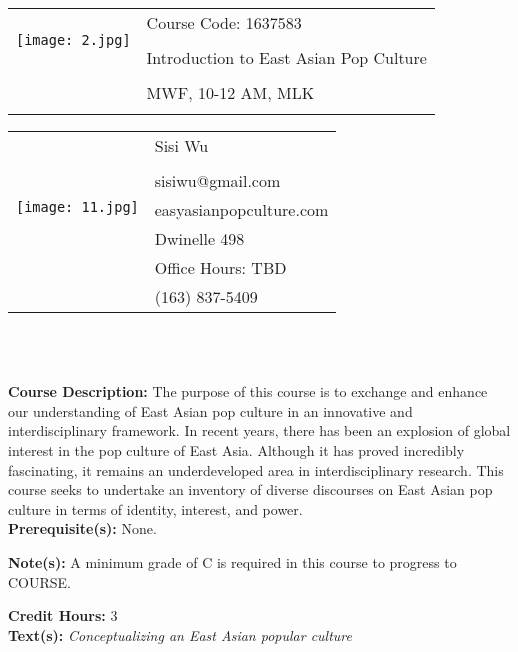 \documentclass[11pt]{article}
\begin{document}
\begin{tabular}{ l l }
  \multirow{3}{*}{\texttt{[image: 2.jpg]}} & \LARGE Course Code: 1637583 \\\\
      & \LARGE Introduction to East Asian Pop Culture \\\\
  & \LARGE MWF, 10-12 AM, MLK \\\\
\end{tabular}
\vspace{10mm}

\begin{tabular}{ l l }
  \multirow{6}{*}{\texttt{[image: 11.jpg]}} & \large Sisi Wu\\\\
  & \large sisiwu@gmail.com \\
  & \large easyasianpopculture.com \\
  & \large Dwinelle 498  \\
  & \large Office Hours: TBD \\
  & \large (163) 837-5409 \\
\end{tabular}
\vspace{5mm}
\begin{center}  \\
\end{center}

\textbf {\large \\ Course Description:} The purpose of this course is to exchange and enhance our understanding of East Asian pop culture in an innovative and interdisciplinary framework. In recent years, there has been an explosion of global interest in the pop culture of East Asia. Although it has proved incredibly fascinating, it remains an underdeveloped area in interdisciplinary research. This course seeks to undertake an inventory of diverse discourses on East Asian pop culture in terms of identity, interest, and power. \\
\textbf {Prerequisite(s):} None.

\textbf {Note(s):} A minimum grade of C is required in this course to progress to COURSE. 

\textbf {Credit Hours:} 3 \\

\textbf {\large Text(s):} \emph{Conceptualizing an East Asian popular culture}
\end{document}
